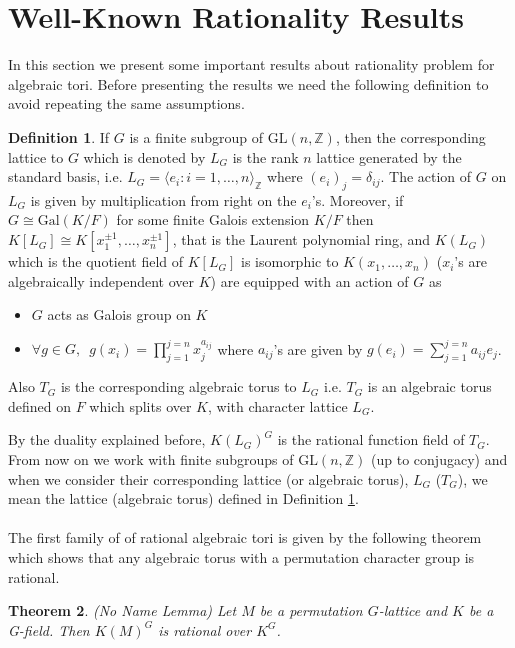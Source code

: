 \documentclass[a4paper, 14pt]{extarticle}
\theoremstyle{plain}
\newtheorem{theorem}{Theorem}
\theoremstyle{definition}
\newtheorem{definition}[theorem]{Definition}
\newcommand{\Z}{\ensuremath{\mathbb{Z}}}
\newcommand{\G}{G}
\newcommand{\glat}{$G$-lattice}
\begin{document}
\section{Well-Known Rationality Results}
In this section we present some important results about rationality problem for 
algebraic tori. Before presenting the results we need the following definition 
to avoid repeating the same assumptions.
\begin{definition}\label{Assumption}
If $G$ is a finite subgroup of $\mathrm{GL}(n,\Z)$, then the corresponding lattice 
to $G$ which is denoted by $L_G$ is the rank $n$ lattice generated by the standard 
basis, i.e. $L_G = \langle e_i : i  = 1, \ldots, n \rangle_\Z$ where $(e_i)_j = \delta_{ij}$. 
The action of $G$ on $L_G$ is given by multiplication from right on the $e_i$'s.
 Moreover, if $G \cong \mathrm{Gal}(K/F)$ for some finite Galois extension $K/F$ 
 then $K[L_G] \cong K[x^{\pm 1}_1, \ldots , x^{\pm 1}_n]$, that is the Laurent 
 polynomial ring, and $K(L_G)$ which is the quotient field of $K[L_G]$ is isomorphic 
 to $K(x_1, \ldots , x_n)$ ($x_i$'s are algebraically independent over $K$) are equipped 
 with an action of $G$ as
\begin{itemize}
\item $G$ acts as Galois group on $K$ 
\item $\forall g \in G, \,\,\, g(x_i) = \prod_{j=1}^{j=n} x_j^{a_{ij}}$  where $a_{ij}$'s 
are given by $g(e_i) = \sum_{j=1}^{j=n} a_{ij}e_j$.
\end{itemize}
Also $T_G$ is the corresponding algebraic torus to $L_G$ i.e. $T_G$ is an algebraic 
torus defined on $F$ which splits over $K$, with character lattice $L_G$. 
\end{definition}
\noindent
By the duality explained before, $K(L_G)^G$ is the rational function field of $T_G$. 
From now on we work with finite subgroups of $\mathrm{GL}(n,\Z)$ (up to conjugacy) and 
when we consider their corresponding lattice (or algebraic torus), $L_G$ ($T_G$), we 
mean the lattice (algebraic torus) defined in Definition \ref{Assumption}. 
\\
\\
The first family of of rational algebraic tori is given by the following theorem which 
shows that any algebraic torus with a permutation character group is rational.
\label{action}
\begin{theorem}\cite{Speiser}\label{NoNameLemma}
(No Name Lemma) Let $M$ be a permutation \glat \,\,and $K$ be a \G-field. Then $K(M)^\G$ 
is rational over $K^\G$. 
\end{theorem}
\end{document}

